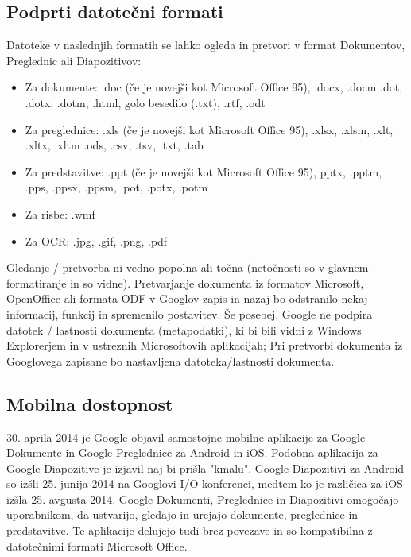 \documentclass[a4paper, 12pt]{book}
\begin{document}
\subsection{Podprti datotečni formati}

Datoteke v naslednjih formatih se lahko ogleda in pretvori v format Dokumentov, Preglednic ali Diapozitivov: \cite{79}
\begin{itemize}
	\item Za dokumente: .doc (če je novejši kot Microsoft Office 95), .docx, .docm .dot, .dotx, .dotm, .html, golo besedilo (.txt), .rtf, .odt
	\item Za preglednice: .xls (če je novejši kot Microsoft Office 95), .xlsx, .xlsm, .xlt, .xltx, .xltm .ods, .csv, .tsv, .txt, .tab
	\item Za predstavitve: .ppt (če je novejši kot Microsoft Office 95), pptx, .pptm, .pps, .ppsx, .ppsm, .pot, .potx, .potm
	\item Za risbe: .wmf
	\item Za OCR: .jpg, .gif, .png, .pdf 
\end{itemize}






Gledanje / pretvorba ni vedno popolna ali točna (netočnosti so v glavnem formatiranje in so vidne). Pretvarjanje dokumenta iz formatov Microsoft, OpenOffice ali formata ODF v Googlov zapis in nazaj bo odstranilo nekaj informacij, funkcij in spremenilo postavitev. Še posebej, Google ne podpira datotek / lastnosti dokumenta (metapodatki), ki bi bili vidni z Windows Explorerjem in v ustreznih Microsoftovih aplikacijah; Pri pretvorbi dokumenta iz Googlovega zapisane bo nastavljena datoteka/lastnosti dokumenta.

\subsection{Mobilna dostopnost}

30. aprila 2014 je Google objavil samostojne mobilne aplikacije za Google Dokumente in Google Preglednice za Android in iOS. Podobna aplikacija za Google Diapozitive je izjavil naj bi prišla "kmalu". Google Diapozitivi za Android so izšli 25. junija 2014 na Googlovi I/O konferenci, medtem ko je različica za iOS izšla 25. avgusta 2014. Google Dokumenti, Preglednice in Diapozitivi omogočajo uporabnikom, da ustvarijo, gledajo in urejajo dokumente, preglednice in predstavitve. Te aplikacije delujejo tudi brez povezave in so kompatibilna z datotečnimi formati Microsoft Office. \cite{80}
\end{document}
